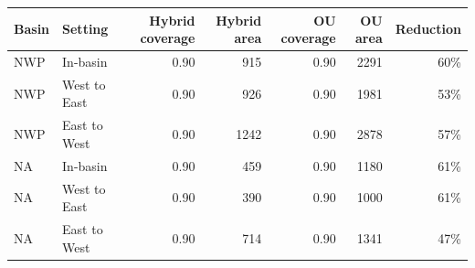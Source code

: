 \begin{tabular}{llrrrrr}
\hline
Basin & Setting & Hybrid coverage & Hybrid area & OU coverage & OU area & Reduction \\
\hline
NWP & In-basin & 0.90 & 915 & 0.90 & 2291 & 60\% \\
NWP & West to East & 0.90 & 926 & 0.90 & 1981 & 53\% \\
NWP & East to West & 0.90 & 1242 & 0.90 & 2878 & 57\% \\
NA & In-basin & 0.90 & 459 & 0.90 & 1180 & 61\% \\
NA & West to East & 0.90 & 390 & 0.90 & 1000 & 61\% \\
NA & East to West & 0.90 & 714 & 0.90 & 1341 & 47\% \\
\hline
\end{tabular}
